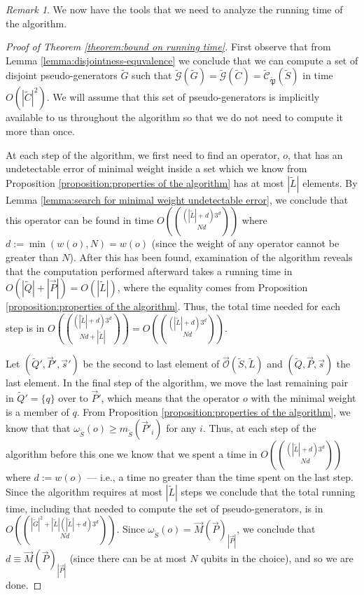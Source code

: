 \documentclass[12pt]{amsbook}
\theoremstyle{plain}
\theoremstyle{definition}
\theoremstyle{remark}
\newtheorem{remark}{Remark}
\newcommand{\lst}{\vec}
\newcommand{\set}{\tilde}
\newcommand{\genfun}{\tilde{\mathcal{G}}}
\newcommand{\pauligroup}{{\set{\mathfrak{P}}}}
\newcommand{\centralizer}{\set{\mathcal{C}}}
\newcommand{\optimizer}{\lst{\mathcal{O}}}
\newcommand{\om}{\omega}
\newcommand{\paren}[1]{\left(#1\right)}
\begin{document}
\begin{remark}
We now have the tools that we need to analyze the running time of the algorithm.
\end{remark}

\begin{proof}[Proof of Theorem \ref{theorem:bound on running time}]
First observe that from Lemma \ref{lemma:disjointness-equvalence} we conclude that we can compute a set of disjoint pseudo-generators $\set G$ such that $\genfun(\set G)=\genfun(\set C)=\centralizer_\pauligroup(\set S)$ in time $O(|\set C|^2)$.  We will assume that this set of pseudo-generators is implicitly available to us throughout the algorithm so that we do not need to compute it more than once.

At each step of the algorithm, we first need to find an operator, $o$, that has an undetectable error of minimal weight inside a set which we know from Proposition \ref {proposition:properties of the algorithm} has at most $|\set L|$ elements.  By Lemma \ref{lemma:search for minimal weight undetectable error}, we conclude that this operator can be found in time $O\paren{(|\set L|+d)3^d\choose{N}{d}}$ where $d:=\min\paren{w(o),N}=w(o)$ (since the weight of any operator cannot be greater than $N$).  After this has been found, examination of the algorithm reveals that the computation performed afterward takes a running time in $O(|\set Q|+|\lst P|)=O(|\set L|)$, where the equality comes from Proposition \ref {proposition:properties of the algorithm}.  Thus, the total time needed for each step is in $O\paren{(|\set L|+d)3^d\choose{N}{d}+|\set L|}=O\paren{(|\set L|+d)3^d\choose{N}{d}}$.

Let $(\set Q',\lst P',\lst s')$ be the second to last element of $\optimizer(\set S,\set L)$ and $(\set Q,\lst P,\lst s)$ the last element.  In the final step of the algorithm, we move the last remaining pair in $\set Q'=\{q\}$ over to $\lst P'$, which means that the operator $o$ with the minimal weight is a member of $q$.  From Proposition \ref {proposition:properties of the algorithm}, we know that that $\om_{\set S}(o)\ge m_{\set S}(\lst P'_i)$ for any $i$.  Thus, at each step of the algorithm before this one we know that we spent a time in $O\paren{(|\set L|+d)3^d\choose{N}{d}}$ where $d:=w(o)$ --- i.e., a time no greater than the time spent on the last step.  Since the algorithm requires at most $|\set L|$ steps we conclude that the total running time, including that needed to compute the set of pseudo-generators, is in $O\paren{|\set G|^2+|\set L|(|\set L|+d)3^d\choose{N}{d}}$.  Since $\om_{\set S}(o)=\lst M(\lst P)_{|\lst P|}$, we conclude that $d\equiv\lst M(\lst P)_{|\lst P|}$ (since there can be at most $N$ qubits in the choice), and so we are done.
\end{proof}
\end{document}

